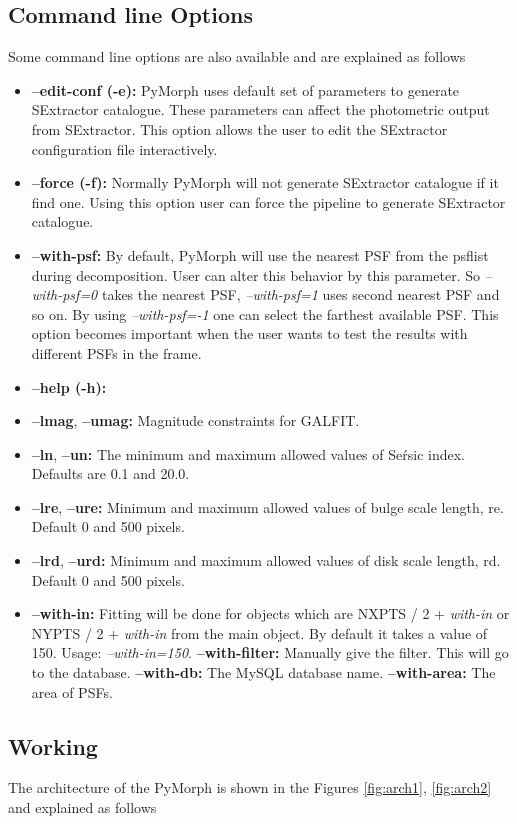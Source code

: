 \documentclass[a4paper,10pt]{article}
\begin{document}
\subsection{Command line Options}
Some command line options are also available and are explained as follows
\begin{itemize}
 \item 
\textbf{ --edit-conf (-e):} PyMorph uses default set of parameters to generate SExtractor catalogue. These parameters can affect the photometric output from SExtractor. This option allows the user to edit the SExtractor configuration file interactively.

\item
\textbf{ --force (-f): } Normally PyMorph will not generate SExtractor catalogue if it find one. Using this option user can force the pipeline to generate SExtractor catalogue.
\item
\textbf{ --with-psf: } By default, PyMorph will use the nearest PSF from the psflist during decomposition. User can alter this behavior by this parameter. So \textit{--with-psf=0} takes the nearest PSF, \textit{--with-psf=1} uses second nearest PSF and so on. By using \textit{--with-psf=-1} one can select the farthest available PSF. This option becomes  important when the user wants to test the results with different PSFs in the frame.
\item
\textbf{ --help (-h): } 
\item
\textbf{ --lmag}, \textbf{ --umag:} Magnitude constraints for GALFIT.
\item
\textbf{ --ln}, \textbf{ --un: } The minimum and maximum allowed values of Se\'rsic index. Defaults are 0.1 and 20.0.
\item
\textbf{ --lre},\textbf{ --ure: } Minimum and maximum allowed values of bulge scale length, re. Default 0 and 500 pixels.
\item
\textbf{ --lrd},\textbf{ --urd: } Minimum and maximum allowed values of disk scale length, rd. Default 0 and 500 pixels.
\item
\textbf{ --with-in: } Fitting will be done for objects which are NXPTS / 2 + \textit{with-in} or NYPTS / 2 + \textit{with-in} from the main object. By default it takes a value of 150. Usage: \textit{--with-in=150}.
\textbf{ --with-filter:} Manually give the filter. This will go to the database.
\textbf{ --with-db:} The MySQL database name.
\textbf{ --with-area:} The area of PSFs.
\end{itemize}

\subsection{Working}
The architecture of the PyMorph is shown in the Figures \ref{fig:arch1}, \ref{fig:arch2} and explained as follows
\end{document}
